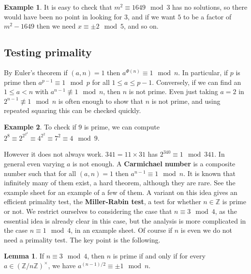 \documentclass{article}
\newcommand{\Z}{\mathbb{Z}}
\newcommand{\rb}[1]{\left( #1 \right)}
\newcommand{\unit}[1]{\rb{\Z / #1\Z}^\times}
\theoremstyle{definition}\newtheorem{definition}{Definition}
\theoremstyle{definition}\newtheorem{remark}[definition]{Remark}
\theoremstyle{definition}\newtheorem*{example}{Example}
\theoremstyle{definition}\newtheorem*{note}{Note}
\newtheorem{lemma}[definition]{Lemma}
\begin{document}
\begin{example}
It is easy to check that $ m^2 \equiv 1649 \mod 3 $ has no solutions, so there would have been no point in looking for $ 3 $, and if we want $ 5 $ to be a factor of $ m^2 - 1649 $ then we need $ x \equiv \pm 2 \mod 5 $, and so on.
\end{example}


\subsection{Testing primality}

By Euler's theorem if $ \rb{a, n} = 1 $ then $ a^{\Phi\rb{n}} \equiv 1 \mod n $. In particular, if $ p $ is prime then $ a^{p - 1} \equiv 1 \mod p $ for all $ 1 \le a \le p - 1 $. Conversely, if we can find an $ 1 \le a < n $ with $ a^{n - 1} \not\equiv 1 \mod n $, then $ n $ is not prime. Even just taking $ a = 2 $ in $ 2^{n - 1} \not\equiv 1 \mod n $ is often enough to show that $ n $ is not prime, and using repeated squaring this can be checked quickly.

\begin{example}
To check if $ 9 $ is prime, we can compute $ 2^8 \equiv 2^{2^{2^2}} \equiv 4^{2^2} \equiv 7^2 \equiv 4 \mod 9 $.
\end{example}

However it does not always work. $ 341 = 11 \times 31 $ has $ 2^{340} \equiv 1 \mod 341 $. In general even varying $ a $ is not enough. A \textbf{Carmichael number} is a composite number such that for all $ \rb{a, n} = 1 $ then $ a^{n - 1} \equiv 1 \mod n $. It is known that infinitely many of them exist, a hard theorem, although they are rare. See the example sheet for an example of a few of them. A variant on this idea gives an efficient primality test, the \textbf{Miller-Rabin test}, a test for whether $ n \in \Z $ is prime or not. We restrict ourselves to considering the case that $ n \equiv 3 \mod 4 $, as the essential idea is already clear in this case, but the analysis is more complicated in the case $ n \equiv 1 \mod 4 $, in an example sheet. Of course if $ n $ is even we do not need a primality test. The key point is the following.

\begin{lemma}
\label{lem:30}
If $ n \equiv 3 \mod 4 $, then $ n $ is prime if and only if for every $ a \in \unit{n} $, we have $ a^{\rb{n - 1} / 2} \equiv \pm 1 \mod n $.
\end{lemma}
\end{document}
